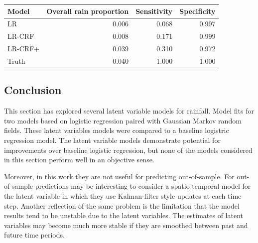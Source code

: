 \begin{table}[ht]
\centering
\begin{tabular}{lrrr}
  \hline
Model & Overall rain proportion & Sensitivity & Specificity \\ 
  \hline
LR & 0.006 & 0.068 & 0.997 \\ 
  LR-CRF & 0.008 & 0.171 & 0.999 \\ 
  LR-CRF+ & 0.039 & 0.310 & 0.972 \\ 
   \hline
   Truth & 0.040 & 1.000 & 1.000
\end{tabular}
\end{table}

\subsection{Conclusion}
This section has explored several latent variable models for rainfall. Model fits for two models based on logistic regression paired with Gaussian Markov random fields. These latent variables models were compared to a baseline logistric regression model. The latent variable models demonstrate potential for improvements over baseline logistic regression, but none of the models considered in this section perform well in an objective sense.

Moreover, in this work they are not useful for predicting out-of-sample. For out-of-sample predictions may be interesting to consider a spatio-temporal model for the latent variable in which they use Kalman-filter style updates at each time step. Another reflection of the same problem is the limitation that the model results tend to be unstable due to the latent variables. The estimates of latent variables may become much more stable if they are smoothed between past and future time periods.